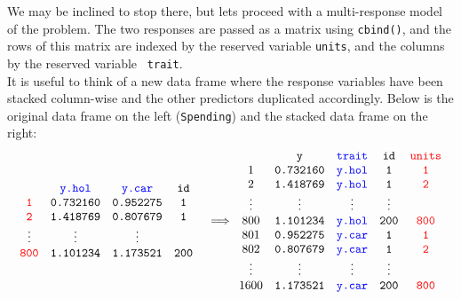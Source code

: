 \documentclass{article}
\begin{document}
 We may be inclined to stop there, but lets proceed with a multi-response model of the problem. The two responses are passed as a matrix using \texttt{cbind()}, and the rows of this matrix are indexed by the reserved variable {\color{red} \texttt{units}}, and the columns by the reserved variable \texttt{\color{blue} \texttt{trait}}.\\ 

It is useful to think of a new data frame where the response variables have been stacked column-wise and the other predictors duplicated accordingly. Below is the original data frame on the left (\texttt{Spending}) and the stacked data frame on the right:\\  

\begin{displaymath}
\begin{array}{cc}
\begin{array}{cccc}
&{\color{blue} \texttt{y.hol}}&{\color{blue} \texttt{y.car}}&\texttt{id}\\
{\color{red} \texttt{1}}&\texttt{0.732160}&\texttt{0.952275}&\texttt{1}\\
{\color{red} \texttt{2}}&\texttt{1.418769}&\texttt{0.807679}&\texttt{1}\\
\vdots&\vdots&\vdots\\
{\color{red} \texttt{800}}&\texttt{1.101234}&\texttt{1.173521}&\texttt{200}\\
\end{array}&
\Longrightarrow
\begin{array}{ccccc}
&\texttt{y}&{\color{blue} \texttt{trait}}&\texttt{id}&{\color{red} \texttt{units}}\\
1&\texttt{0.732160}&{\color{blue} \texttt{y.hol}}&\texttt{1}&{\color{red} \texttt{1}}\\
2&\texttt{1.418769}&{\color{blue} \texttt{y.hol}}&\texttt{1}&{\color{red} \texttt{2}}\\
\vdots&\vdots&\vdots&\vdots\\
800&\texttt{1.101234}&{\color{blue} \texttt{y.hol}}&\texttt{200}&{\color{red} \texttt{800}}\\
801&\texttt{0.952275}&{\color{blue} \texttt{y.car}}&\texttt{1}&{\color{red} \texttt{1}}\\
802&\texttt{0.807679}&{\color{blue} \texttt{y.car}}&\texttt{1}&{\color{red} \texttt{2}}\\
\vdots&\vdots&\vdots&\vdots\\
1600&\texttt{1.173521}&{\color{blue} \texttt{y.car}}&\texttt{200}&{\color{red} \texttt{800}}\\
\end{array}
\end{array}
\end{displaymath}
\end{document}
